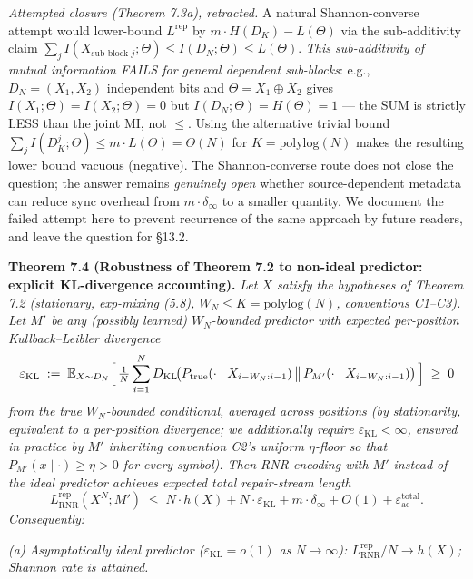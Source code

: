 \documentclass[
]{article}
\begin{document}
\emph{Attempted closure (Theorem 7.3a), retracted.} A natural Shannon-converse
attempt would lower-bound $L^{\mathrm{rep}}$ by $m \cdot H(D_K) -
L(\Theta)$ via the sub-additivity claim $\sum_j I(X_{\text{sub-block } j};
\Theta) \leq I(D_N; \Theta) \leq L(\Theta)$. \emph{This sub-additivity
of mutual information FAILS for general dependent sub-blocks}: e.g.,
$D_N = (X_1, X_2)$ independent bits and $\Theta = X_1 \oplus X_2$
gives $I(X_1; \Theta) = I(X_2; \Theta) = 0$ but $I(D_N; \Theta) =
H(\Theta) = 1$ --- the SUM is strictly LESS than the joint MI, not
$\leq$. Using the alternative trivial bound $\sum_j I(D_K^j; \Theta)
\leq m \cdot L(\Theta) = \Theta(N)$ for $K = \mathrm{polylog}(N)$
makes the resulting lower bound vacuous (negative). The
Shannon-converse route does not close the question; the answer
remains \emph{genuinely open} whether source-dependent metadata
can reduce sync overhead from $m \cdot \delta_\infty$ to a smaller
quantity. We document the failed attempt here to prevent recurrence
of the same approach by future readers, and leave the question for
§13.2.

\textbf{Theorem 7.4 (Robustness of Theorem 7.2 to non-ideal predictor:
explicit KL-divergence accounting).} \emph{Let $X$ satisfy the
hypotheses of Theorem 7.2 (stationary, exp-mixing (5.8),
$W_N \leq K = \mathrm{polylog}(N)$, conventions C1--C3). Let $M'$ be
any (possibly learned) $W_N$-bounded predictor with expected per-position
Kullback--Leibler divergence}
\[
\varepsilon_{\mathrm{KL}}
\;:=\;
\mathbb{E}_{X \sim D_N}\Bigl[\,\tfrac{1}{N} \sum_{i=1}^N
  D_{\mathrm{KL}}\!\bigl(P_{\mathrm{true}}(\cdot \mid X_{i-W_N : i-1})
  \,\big\|\, P_{M'}(\cdot \mid X_{i-W_N : i-1})\bigr)
\,\Bigr] \;\geq\; 0
\]
\emph{from the true $W_N$-bounded conditional, averaged across positions
(by stationarity, equivalent to a per-position divergence; we additionally
require $\varepsilon_{\mathrm{KL}} < \infty$, ensured in practice by
$M'$ inheriting convention C2's uniform $\eta$-floor so that
$P_{M'}(x \mid \cdot) \geq \eta > 0$ for every symbol). Then RNR
encoding with $M'$ instead of the ideal predictor achieves expected
total repair-stream length}
\[
L^{\mathrm{rep}}_{\mathrm{RNR}}(X^N; M')
\;\leq\;
N \cdot h(X) + N \cdot \varepsilon_{\mathrm{KL}} + m \cdot \delta_\infty + O(1) + \varepsilon_{\mathrm{ac}}^{\mathrm{total}}.
\]
\emph{Consequently:}

\emph{(a) Asymptotically ideal predictor ($\varepsilon_{\mathrm{KL}} =
o(1)$ as $N \to \infty$): $L^{\mathrm{rep}}_{\mathrm{RNR}} / N \to h(X)$;
Shannon rate is attained.}
\end{document}

